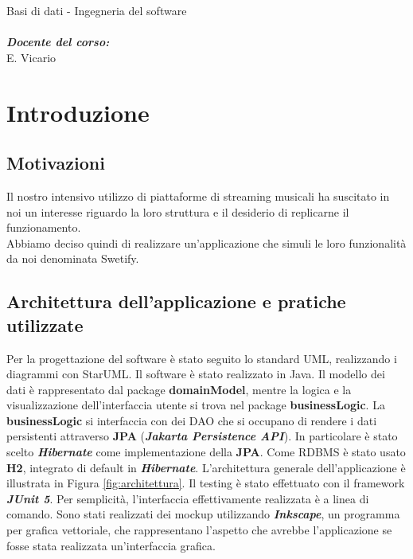 \documentclass{article}
\begin{document}
\begin{titlepage}
\begin{center}
\begin{adjustwidth}{1cm}{}
\begin{flushleft}
\begin{minipage}[t]{0.45\textwidth}
            \hspace*{1.1cm} Basi di dati - Ingegneria del software \\
            \vspace{0.5cm} \\
            \hspace*{1.1cm} \textit{\textbf{Docente del corso:}} \\
            \hspace*{1.1cm} E. Vicario \\
          \end{minipage}
        \end{flushleft}
      \end{adjustwidth}
    \end{center}
  \end{titlepage}

  \renewcommand{\contentsname}{\LARGE Indice}
  \tableofcontents
  \pagebreak


  \section{Introduzione}

  \subsection{Motivazioni}
  Il nostro intensivo utilizzo di piattaforme di streaming musicali ha suscitato in noi un interesse riguardo
  la loro struttura e il desiderio di replicarne il funzionamento.\\
  Abbiamo deciso quindi di realizzare un'applicazione che simuli le loro funzionalità da noi denominata Swetify.

  \subsection{Architettura dell'applicazione e pratiche utilizzate}
  Per la progettazione del software è stato seguito lo standard UML, realizzando i diagrammi con StarUML.
  Il software è stato realizzato in Java. Il modello dei dati è rappresentato dal package \textbf{domainModel},
  mentre la logica e la visualizzazione dell'interfaccia utente si trova nel package \textbf{businessLogic}. La \textbf{businessLogic} si interfaccia con dei DAO che si occupano di rendere i dati persistenti attraverso \textbf{JPA} (\textbf{\textit{Jakarta Persistence API}}). In particolare è stato scelto \textbf{\textit{Hibernate}} come implementazione della \textbf{JPA}. Come RDBMS è stato usato \textbf{H2}, integrato di default in \textbf{\textit{Hibernate}}. L'architettura generale dell'applicazione è illustrata in Figura \ref{fig:architettura}.
  Il testing è stato effettuato con il framework \textbf{\textit{JUnit 5}}.
  Per semplicità, l'interfaccia effettivamente realizzata è a linea di comando.
  Sono stati realizzati dei mockup utilizzando \textbf{\textit{Inkscape}}, un programma per grafica vettoriale, che rappresentano l'aspetto che avrebbe l'applicazione se fosse stata realizzata un'interfaccia grafica.
\end{document}

